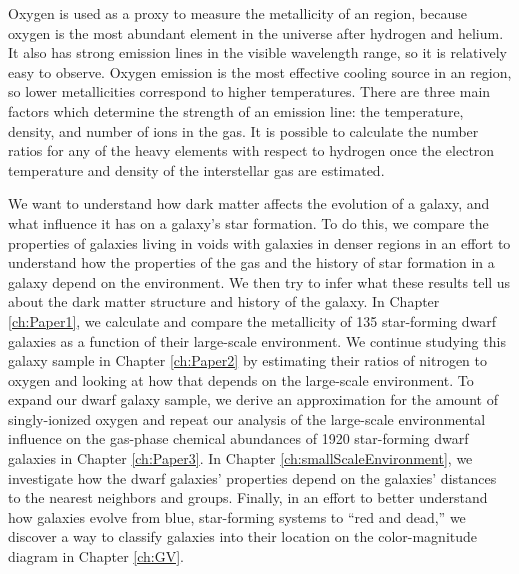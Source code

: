 Oxygen is used as a proxy to measure the metallicity of an  region, 
because oxygen is the most abundant element in the universe after hydrogen and 
helium.  It also has strong emission lines in the visible wavelength range, so 
it is relatively easy to observe.  Oxygen emission is the most effective cooling 
source in an  region, so lower metallicities correspond to higher 
temperatures.  There are three main factors which determine the strength of an 
emission line: the temperature, density, and number of ions in the gas.  It is 
possible to calculate the number ratios for any of the heavy elements with 
respect to hydrogen once the electron temperature and density of the 
interstellar gas are estimated.


We want to understand how dark matter affects the evolution of a galaxy, and 
what influence it has on a galaxy's star formation.  To do this, we compare the 
properties of galaxies living in voids with galaxies in denser regions in an 
effort to understand how the properties of the gas and the history of star 
formation in a galaxy depend on the environment.  We then try to infer what 
these results tell us about the dark matter structure and history of the galaxy.  
In Chapter \ref{ch:Paper1}, we calculate and compare the metallicity of 135 
star-forming dwarf galaxies as a function of their large-scale environment.  We 
continue studying this galaxy sample in Chapter \ref{ch:Paper2} by estimating 
their ratios of nitrogen to oxygen and looking at how that depends on the 
large-scale environment.  To expand our dwarf galaxy sample, we derive an 
approximation for the amount of singly-ionized oxygen and repeat our analysis of 
the large-scale environmental influence on the gas-phase chemical abundances of 
1920 star-forming dwarf galaxies in Chapter \ref{ch:Paper3}.  In Chapter 
\ref{ch:smallScaleEnvironment}, we investigate how the dwarf galaxies' 
properties depend on the galaxies' distances to the nearest neighbors and 
groups.  Finally, in an effort to better understand how galaxies evolve from 
blue, star-forming systems to ``red and dead,'' we discover a way to classify 
galaxies into their location on the color-magnitude diagram in Chapter 
\ref{ch:GV}.